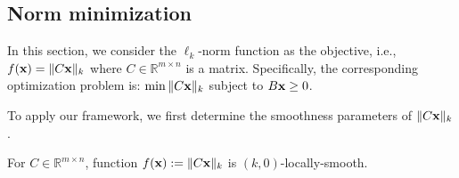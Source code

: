 
\subsection{Norm minimization} \label{appix-norm}

In this section, we consider the $\ell_{k}$-norm function as the objective, i.e.,  $f(\mathbf{x}) = \|C \mathbf{x}\|_{k}$ where $C \in \mathbb{R}^{m \times n}$ is a matrix. 
Specifically, the corresponding optimization problem is: $\min \|C \mathbf{x}\|_{k}$ subject to $B \mathbf{x} \geq 0$. 

To apply our framework, we first determine the smoothness parameters of $\|C \mathbf{x}\|_{k}$.

\begin{lemma} \label{lem-makespan}
For $C \in \mathbb{R}^{m \times n}$, function $f(\mathbf{x}) := \|C \mathbf{x}\|_{k}$ is $(k,0)$-locally-smooth.
\end{lemma}
%
